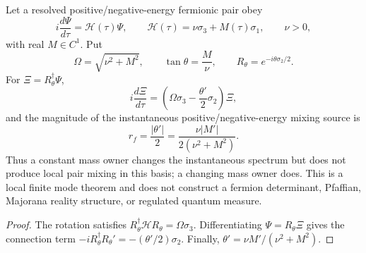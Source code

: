 \documentclass[12pt,a4paper]{article}
\begin{document}
\begin{theorem}
\label{p4:thm:v247-two-level-fermion-mixing}
Let a resolved positive/negative-energy fermionic pair obey
\[
 i\frac{d\Psi}{d\tau}=\mathcal H(\tau)\Psi,
 \qquad
 \mathcal H(\tau)=\nu\sigma_3+M(\tau)\sigma_1,
 \qquad \nu>0,
\]
with real \(M\in C^1\).  Put
\[
 \Omega=\sqrt{\nu^2+M^2},
 \qquad
 \tan\theta=\frac{M}{\nu},
 \qquad
 R_\theta=e^{-i\theta\sigma_2/2}.
\]
For \(\Xi=R_\theta^\dagger\Psi\),
\[
 \boxed{
 i\frac{d\Xi}{d\tau}
 =\left(\Omega\sigma_3-\frac{\theta'}2\sigma_2\right)\Xi,}
\]
and the magnitude of the instantaneous positive/negative-energy mixing source
is
\[
 \boxed{r_f=\frac{|\theta'|}{2}
 =\frac{\nu|M'|}{2(\nu^2+M^2)}.}
\]
Thus a constant mass owner changes the instantaneous spectrum but does not
produce local pair mixing in this basis; a changing mass owner does.  This is
a local finite mode theorem and does not construct a fermion determinant,
Pfaffian, Majorana reality structure, or regulated quantum measure.
\end{theorem}
\begin{proof}
The rotation satisfies
\(R_\theta^\dagger\mathcal H R_\theta=\Omega\sigma_3\).  Differentiating
\(\Psi=R_\theta\Xi\) gives the connection term
\(-iR_\theta^\dagger R_\theta'=-(\theta'/2)\sigma_2\).  Finally,
\(\theta'=\nu M'/(\nu^2+M^2)\).
\end{proof}
\end{document}
